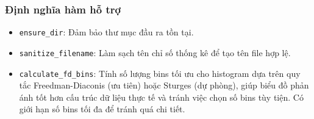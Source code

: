 \documentclass[12pt, a4paper]{report}
\begin{document}
\subsubsection*{Định nghĩa hàm hỗ trợ}
\begin{itemize}
    \item \texttt{ensure\_dir}: Đảm bảo thư mục đầu ra tồn tại.
    \item \texttt{sanitize\_filename}: Làm sạch tên chỉ số thống kê để tạo tên file hợp lệ.
    \item \texttt{calculate\_fd\_bins}: Tính số lượng bins tối ưu cho histogram dựa trên quy tắc Freedman-Diaconis (ưu tiên) hoặc Sturges (dự phòng), giúp biểu đồ phản ánh tốt hơn cấu trúc dữ liệu thực tế và tránh việc chọn số bins tùy tiện. Có giới hạn số bins tối đa để tránh quá chi tiết.
\end{itemize}
\end{document}
